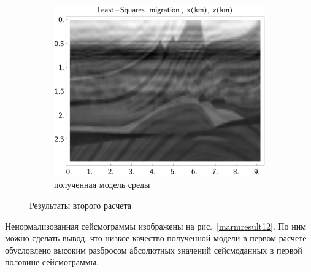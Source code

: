 \documentclass{article}
\newcommand  {\figref  } [1]     {рис.~\ref{#1}}
\begin{document}
\begin{figure}[tb]
\begin{subfigure}{.3333\textwidth}\includegraphics[width=\textwidth]{pic/report_april/zo_inv_bad}\caption{полученная модель среды}\end{subfigure}%
\caption{Результаты второго расчета} \label{marmresult2}
\end{figure}
%
Ненормализованная сейсмограммы изображены на \figref{marmresult12}. По ним можно сделать вывод, что низкое качество полученной модели в первом расчете обусловлено высоким разбросом абсолютных значений сейсмоданных в первой половине сейсмограммы.
%
\end{document}
